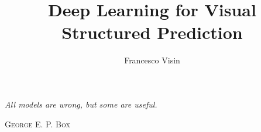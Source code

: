 \documentclass[10pt,twoside,openright,english,italian]{book}%
\author{Francesco Visin}
\title{Deep Learning for Visual Structured Prediction}
\let\originalepigraph\epigraph
\renewcommand\epigraph[2]{\originalepigraph{\textit{#1}}{\textsc{#2}}}
\begin{document}

\maketitle

\pagestyle{empty}

\cleardoublepage
\newpage

\setlength{\epigraphwidth}{0.4\textwidth}
\epigraph{All models are wrong, but some are useful.}{George E. P. Box}
\clearpage

%

\cleardoublepage
\newpage

\pagestyle{fancy}
\setcounter{page}{1}





\tableofcontents
\cleardoublepage
\newpage

\setcounter{page}{1}

\cleardoublepage








\cleardoublepage
{}
{}
\small

%

\end{document}
